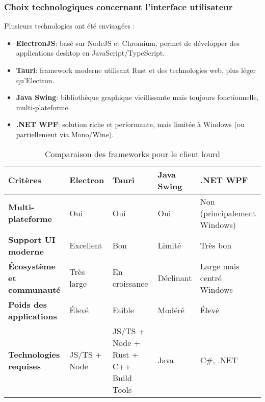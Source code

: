 \subsubsection{Choix technologiques concernant l'interface utilisateur} \label{sec:choix_client}
Plusieurs technologies ont été envisagées :
\begin{itemize}
    \item \textbf{ElectronJS}: basé sur NodeJS et Chromium, permet de développer des applications desktop en JavaScript/TypeScript.
    \item \textbf{Tauri}: framework moderne utilisant Rust et des technologies web, plus léger qu’Electron.
    \item \textbf{Java Swing}: bibliothèque graphique vieillissante mais toujours fonctionnelle, multi-plateforme.
    \item \textbf{.NET WPF}: solution riche et performante, mais limitée à Windows (ou partiellement via Mono/Wine).
\end{itemize}

\begin{longtable}[H]{|p{}|p{}|p{}|p{}|p{}|}
\caption{\label{tab:comparison_clients} Comparaison des frameworks pour le client lourd} \\

\hline
\textbf{Critères} & \textbf{Electron} & \textbf{Tauri} & \textbf{Java Swing} & \textbf{.NET WPF} \\
\endfirsthead

\hline
\textbf{Multi-plateforme} & Oui & Oui & Oui & Non (principalement Windows) \\
\hline
\textbf{Support UI moderne} & Excellent & Bon & Limité & Très bon \\
\hline
\textbf{Écosystème et communauté} & Très large & En croissance & Déclinant & Large mais centré Windows \\
\hline
\textbf{Poids des applications} & Élevé & Faible & Modéré & Élevé \\
\hline
\textbf{Technologies requises} & JS/TS + Node & JS/TS + Node + Rust + C++ Build Tools & Java & C\#, .NET \\
\hline
\end{longtable}
